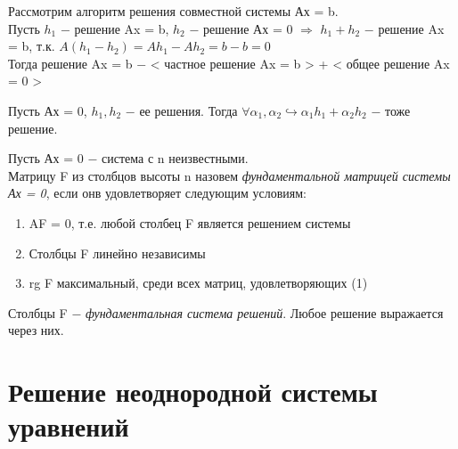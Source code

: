 Рассмотрим алгоритм решения совместной системы Ах = b.\\

Пусть $h_1$ $-$ решение Ax = b, $h_2$ $-$ решение Ах = 0 $\Longrightarrow$ $h_1 + h_2$ $-$ решение Ax = b, т.к. $A(h_1 - h_2) = Ah_1 - Ah_2 = b - b = 0$\\

Тогда решение Ax = b $-$ < частное решение Ax = b > + < общее решение Ax = 0 >\\ 

\begin{note}
    Пусть Ах = 0, $h_1, h_2$ $-$ ее решения. Тогда $\forall \alpha_1, \alpha_2 \hookrightarrow \alpha_1h_1 + \alpha_2h_2$ $-$ тоже решение.
\end{note}

\begin{definition}
   Пусть Ах = 0 $-$ система с n неизвестными.\\
   Матрицу F из столбцов высоты n назовем \textit{фундаментальной матрицей системы Ах = 0}, если онв удовлетворяет следующим условиям:
   \begin{enumerate}
       \item AF = 0, т.е. любой столбец F является решением системы
       \item Столбцы F линейно независимы
       \item rg F максимальный, среди всех матриц, удовлетворяющих (1)
   \end{enumerate}
\end{definition}

Столбцы F $-$ \textit{фундаментальная система решений}. Любое решение выражается через них.








\section{Решение неоднородной системы уравнений}

